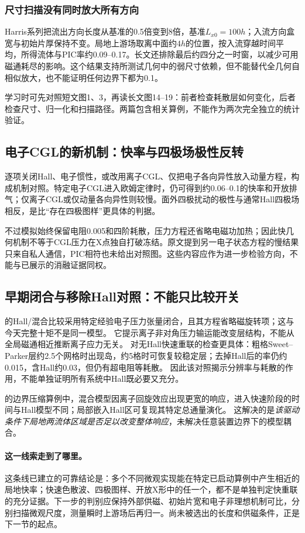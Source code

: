 \subsubsection{尺寸扫描没有同时放大所有方向}
Harris系列把流出方向长度从基准的0.5倍变到8倍，基准$L_{x0}=100h$；入流方向盒宽与初始片厚保持不变。局地上游场取离中面约$4h$的位置，按入流穿越时间平均，所得流体与PIC率约0.09--0.17。长文还排除最后约四分之一时窗，以减少可用磁通耗尽的影响。这个结果支持所测试几何中的弱尺寸依赖，但不能替代全几何自相似放大，也不能证明任何边界下都为0.1。

学习时可先对照短文图1、3，再读长文图14--19：前者检查耗散层如何变化，后者检查尺寸、归一化和扫描路径。两篇包含相关算例，不能作为两次完全独立的统计验证。\citep{L216,L217}

\subsection{电子CGL的新机制：快率与四极场极性反转}
\citet{Cassak2015}逐项关闭Hall、电子惯性，或改用离子CGL、仅把电子各向异性放入动量方程，构成机制对照。特定电子CGL进入欧姆定律时，仍可得到约0.06--0.1的快率和开放排气；仅离子CGL或仅动量各向异性则较慢。面外四极扰动的极性与通常Hall四极场相反，是比“存在四极图样”更具体的判据。

不过模拟始终保留电阻0.005和四阶耗散，压力方程还省略电磁功加热；因此快几何机制不等于CGL压力在X点独自打破冻结。原文提到另一电子状态方程的慢结果只来自私人通信，PIC相符也未给出对照图。这些内容应作为进一步检验方向，不能与已展示的消融证据同权。

\subsection{早期闭合与移除Hall对照：不能只比较开关}
\citet{L029}的Hall/混合比较采用特定经验电子压力张量闭合，且其方程省略磁旋转项；这与今天完整十矩不是同一模型。
它提示离子非对角压力输运能改变层结构，不能从全局磁通相近推断离子应力无关。
\citet{L154}对无Hall快速重联的检查更具体：粗格Sweet--Parker层约2.5个网格时出现岛，约5格时可恢复较稳定层；去掉Hall后的率仍约0.015，含Hall约0.03，但仍有超电阻等耗散。
因此该对照揭示分辨率与耗散的作用，不能单独证明所有系统中Hall既必要又充分。

\citet{L035}的边界压缩算例中，混合模型因离子回旋效应出现更宽的响应，进入快速阶段的时间与Hall模型不同；局部嵌入Hall区可复现其特定总通量演化。
这解决的是\emph{该驱动条件下局地两流体区域是否足以改变整体响应}，未解决任意装置边界下的模型耦合。

\paragraph{这一线索走到了哪里。}这条线已建立的可靠结论是：多个不同微观实现能在特定已启动算例中产生相近的局地快率；快速色散波、四极图样、开放X形中的任一个，都不是单独判定快重联的充分证据。下一步的判别应保持外部供磁、初始片宽和电子非理想机制可比，分别扫描微观尺度，测量瞬时上游场后再归一。尚未被选出的长度和供磁条件，正是下一节的起点。
